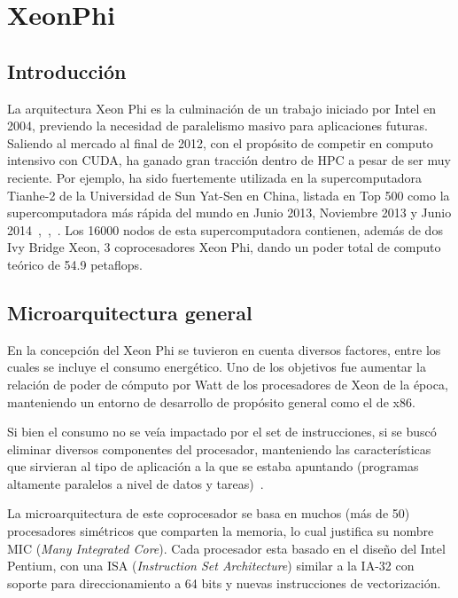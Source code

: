 \section{XeonPhi}

\subsection{Introducci\'on}

La arquitectura Xeon Phi es la culminaci\'on de un trabajo iniciado por Intel en 2004, previendo
la necesidad de paralelismo masivo para aplicaciones futuras. Saliendo al mercado al final de 2012,
con el prop\'osito de competir en computo intensivo con \nvidia CUDA, ha ganado gran tracci\'on dentro
de HPC a pesar de ser muy reciente. Por ejemplo, ha sido fuertemente utilizada en la supercomputadora Tianhe-2
de la Universidad de Sun Yat-Sen en China, listada en Top 500 como la supercomputadora m\'as r\'apida del
mundo en Junio 2013, Noviembre 2013 y Junio 2014~\cite{Top500XeonPhiJune2013},~\cite{Top500XeonPhiNov2013},~\cite{Top500XeonPhiJune2014}.
Los 16000 nodos de esta supercomputadora contienen, adem\'as de dos Ivy Bridge Xeon, 3 coprocesadores
Xeon Phi, dando un poder total de computo te\'orico de 54.9 petaflops.

\subsection{Microarquitectura general}

En la concepci\'on del Xeon Phi se tuvieron en cuenta diversos factores, entre los cuales
se incluye el consumo energ\'etico. Uno de los objetivos fue aumentar la relaci\'on de
poder de c\'omputo por Watt de los procesadores de Xeon de la \'epoca, manteniendo un entorno
de desarrollo de prop\'osito general como el de x86.

Si bien el consumo no se ve\'ia impactado por el set de instrucciones,
si se busc\'o eliminar diversos componentes del procesador, manteniendo las caracter\'isticas
que sirvieran al tipo de aplicaci\'on a la que se estaba
apuntando (programas altamente paralelos a nivel de datos y tareas)~\cite{BookXeonPhi}.

La microarquitectura de este coprocesador se basa en muchos (m\'as de 50) procesadores sim\'etricos que comparten la memoria, lo
cual justifica su nombre MIC (\textit{Many Integrated Core}). Cada procesador esta basado
en el dise\~no del Intel Pentium, con una ISA (\textit{Instruction Set Architecture}) similar a la IA-32 con
soporte para direccionamiento a 64 bits y nuevas instrucciones de vectorizaci\'on.

